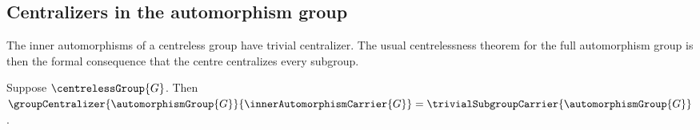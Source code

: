 \subsection{Centralizers in the automorphism group}

The inner automorphisms of a centreless group have trivial centralizer.  The
usual centrelessness theorem for the full automorphism group is then the
formal consequence that the centre centralizes every subgroup.

\begin{theorem}\label{inner_automorphism_centralizer_trivial}
    Suppose $\centrelessGroup{G}$.
    Then
        $\groupCentralizer
            {\automorphismGroup{G}}
            {\innerAutomorphismCarrier{G}}
        =\trivialSubgroupCarrier{\automorphismGroup{G}}$.
\end{theorem}
